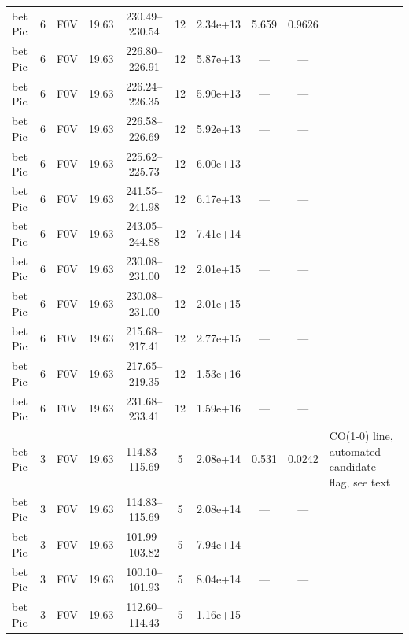 \documentclass{openjournal}
\begin{document}
\begin{table}
\begin{tabularx}{\textwidth}{@{}l c c c c c c c c X@{}}
bet Pic & 6 & F0V & 19.63 & 230.49--230.54 & 12 & 2.34e+13 & 5.659 & 0.9626 &  \\
bet Pic & 6 & F0V & 19.63 & 226.80--226.91 & 12 & 5.87e+13 & --- & --- &  \\
bet Pic & 6 & F0V & 19.63 & 226.24--226.35 & 12 & 5.90e+13 & --- & --- &  \\
bet Pic & 6 & F0V & 19.63 & 226.58--226.69 & 12 & 5.92e+13 & --- & --- &  \\
bet Pic & 6 & F0V & 19.63 & 225.62--225.73 & 12 & 6.00e+13 & --- & --- &  \\
bet Pic & 6 & F0V & 19.63 & 241.55--241.98 & 12 & 6.17e+13 & --- & --- &  \\
bet Pic & 6 & F0V & 19.63 & 243.05--244.88 & 12 & 7.41e+14 & --- & --- &  \\
bet Pic & 6 & F0V & 19.63 & 230.08--231.00 & 12 & 2.01e+15 & --- & --- &  \\
bet Pic & 6 & F0V & 19.63 & 230.08--231.00 & 12 & 2.01e+15 & --- & --- &  \\
bet Pic & 6 & F0V & 19.63 & 215.68--217.41 & 12 & 2.77e+15 & --- & --- &  \\
bet Pic & 6 & F0V & 19.63 & 217.65--219.35 & 12 & 1.53e+16 & --- & --- &  \\
bet Pic & 6 & F0V & 19.63 & 231.68--233.41 & 12 & 1.59e+16 & --- & --- &  \\
bet Pic & 3 & F0V & 19.63 & 114.83--115.69 & 5 & 2.08e+14 & 0.531 & 0.0242 & CO(1-0) line, automated candidate flag, see text \\
bet Pic & 3 & F0V & 19.63 & 114.83--115.69 & 5 & 2.08e+14 & --- & --- &  \\
bet Pic & 3 & F0V & 19.63 & 101.99--103.82 & 5 & 7.94e+14 & --- & --- &  \\
bet Pic & 3 & F0V & 19.63 & 100.10--101.93 & 5 & 8.04e+14 & --- & --- &  \\
bet Pic & 3 & F0V & 19.63 & 112.60--114.43 & 5 & 1.16e+15 & --- & --- &  \\
\hline
\end{tabularx}
\end{table}
\end{document}
